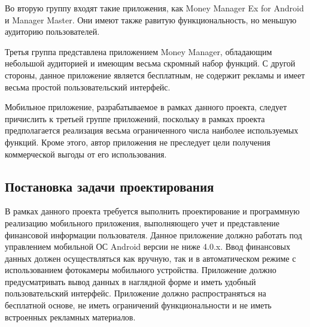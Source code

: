 Во вторую группу входят такие приложения, как
Money Manager Ex for Android и Manager Master.
Они имеют также равитую функциональность, но меньшую аудиторию пользователей.

Третья группа представлена приложением Money Manager,
обладающим небольшой аудиторией и имеющим весьма скромный набор функций.
С другой стороны, данное приложение является бесплатным, не содержит рекламы
и имеет весьма простой пользовательский интерфейс.

Мобильное приложение, разрабатываемое в рамках данного проекта,
следует причислить к третьей группе приложений,
поскольку в рамках проекта предполагается реализация весьма
ограниченного числа наиболее используемых функций.
Кроме этого, автор приложения не преследует цели получения коммерческой выгоды
от его использования.

\subsection{Постановка задачи проектирования}

В рамках данного проекта требуется выполнить проектирование и
программную реализацию мобильного приложения, выполняющего учет и представление
финансовой информации пользователя.
Данное приложение должно работать под управлением мобильной ОС Android версии
не ниже 4.0.x. Ввод финансовых данных должен осуществляться как вручную,
так и в автоматическом режиме с использованием фотокамеры мобильного устройства.
Приложение должно предусматривать вывод данных в наглядной форме и иметь
удобный пользовательский интерфейс.
Приложение должно распространяться на бесплатной основе,
не иметь ограничений функциональности и не иметь встроенных рекламных материалов.
